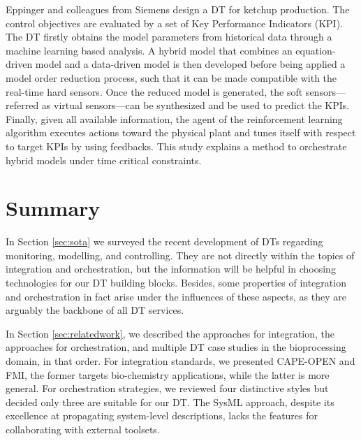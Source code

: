 Eppinger and colleagues from Siemens \cite{Eppinger2021} design a DT for ketchup production. The control objectives are evaluated by a set of Key Performance Indicators (KPI). The DT firstly obtains the model parameters from historical data through a machine learning based analysis. A hybrid model that combines an equation-driven model and a data-driven model is then developed before being applied a model order reduction process, such that it can be made compatible with the real-time hard sensors. Once the reduced model is generated, the soft sensors---referred as virtual sensors---can be synthesized and be used to predict the KPIs. Finally, given all available information, the agent of the reinforcement learning algorithm executes actions toward the physical plant and tunes itself with respect to target KPIs by using feedbacks. This study explains a method to orchestrate hybrid models under time critical constraints. 

\section{Summary}
In Section \ref{sec:sota} we surveyed the recent development of DTs regarding monitoring, modelling, and controlling. They are not directly within the topics of integration and orchestration, but the information will be helpful in choosing technologies for our DT building blocks. Besides, some properties of integration and orchestration in fact arise under the influences of these aspects, as they are arguably the backbone of all DT services.

In Section \ref{sec:relatedwork}, we described the approaches for integration, the approaches for orchestration, and multiple DT case studies in the bioprocessing domain, in that order. For integration standards, we presented CAPE-OPEN and FMI, the former targets bio-chemistry applications, while the latter is more general. For orchestration strategies, we reviewed four distinctive styles but decided only three are suitable for our DT. The SysML approach, despite its excellence at propagating system-level descriptions, lacks the features for collaborating with external toolsets. 

